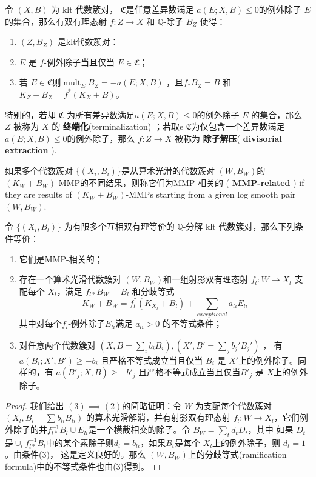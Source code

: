\begin{corollary}\label{extraction}
	\citet[Corollary 13.7]{haconMinimalModelProgram2012} 令 $ (X,B) $ 为 klt 代数簇对， $\mathfrak{C}$是任意差异数满足 $ a(E;X,B)\leqslant 0 $的例外除子 $E$ 的集合，那么有双有理态射 $ f:Z\to X $ 和 $ \mathbb{Q} $-除子 $ B_Z $ 使得：
	\begin{enumerate}
		\item $ (Z,B_Z) $ 是klt代数簇对：
		\item $ E $ 是 $f$-例外除子当且仅当 $ E\in \mathfrak{C} $；
		\item  若 $E \in \mathfrak{C}$则$ \operatorname{mult}_{E}B_Z=-a(E;X,B) $ ，且$ f_*B_Z=B $ 和 $ K_Z+B_Z=f^*(K_X+B) $。
	\end{enumerate}
	特别的，若却 $\mathfrak{C}$ 为所有差异数满足$a(E; X, B)\leqslant 0$的例外除子 $E$ 的集合，那么 $ Z $ 被称为 $X$ 的 \textbf{终端化}(terminalization) ；若取e $\mathfrak{C}$为仅包含一个差异数满足 $a(E; X, B)\leqslant 0$的例外除子，那么 $ f: Z\to X $ 被称为 \textbf{除子解压}( \textbf{divisorial extraction} ).
\end{corollary}

\begin{definition}
	\citet[Definition 3.3]{brunoLogSarkisovProgram1995}
	如果多个代数簇对 $ \{(X_i,B_i)\} $是从算术光滑的代数簇对 $(W,B_{W})$的 $(K_{W}+B_{W}) $-MMP的不同结果，则称它们为MMP-相关的 ( \textbf{MMP-related} ) if they are results of $ (K_W+B_W) $-MMPs starting from a given log smooth pair $(W,B_{W})$.
\end{definition}

\begin{lemma}\label{MMPrelatedConditation}
	\citet[Proposition 3.4]{brunoLogSarkisovProgram1995}
	令 $ \{(X_l,B_l)\} $ 为有限多个互相双有理等价的 $ \mathbb{Q} $-分解 klt 代数簇对，那么下列条件等价：
	\begin{enumerate}
		\item 它们是MMP-相关的；
		\item 存在一个算术光滑代数簇对 $ (W,B_W) $和一组射影双有理态射  $ f_l:W\to  X_l $ 支配每个 $ X_l $，满足 $ f_{l*}B_W=B_l $ 和分歧等式
		      \[ K_W+B_W=f_l^*(K_{X_l}+B_l)+\sum_{exceptional}{a_{li}E_{li}} \]
		      其中对每个$ f_l $-例外除子$E_{li}$满足 $a_{li}>0$ 的不等式条件；
		\item 对任意两个代数簇对 $ (X,B=\sum_ib_{i }B_i),(X',B'=\sum_{j}b_{j}'B_{j}') $ ， 有  $ a(B_i;X',B')\geqslant -b_i $ 且严格不等式成立当且仅当 $ B_i $ 是 $ X' $上的例外除子。同样的，有 $ a(B'_j;X,B)\geqslant -b'_j $ 且严格不等式成立当且仅当$ B'_j $ 是 $ X $上的例外除子。
	\end{enumerate}
\end{lemma}
\begin{proof}
  我们给出  $(3) \implies (2)$的简略证明：令 $W$ 为支配每个代数簇对 $(X_l,B_l=\sum b_{li}B_{li})$ 的算术光滑解消，并有射影双有理态射 $f_l:W\to X_l$，它们例外除子的并$f_{l*}^{-1}B_l\cup E_{li}$是一个横截相交的除子。令 $B_W=\sum_t d_tD_t $，其中  如果 $D_t$ 是$\cup_l f_{l*}^{-1}B_l$中的某个素除子则$d_t = b_{li}$，如果$B_{t}$是每个 $X_{l}$上的例外除子，则  $d_t=1$。由条件(3)， 这是定义良好的。那么 $(W,B_{W})$上的分歧等式(ramification formula)中的不等式条件也由(3)得到。
\end{proof}

